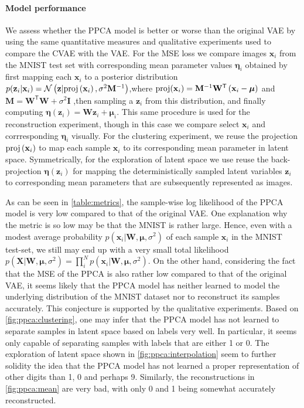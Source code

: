 \paragraph{Model performance}
We assess whether the PPCA model is better or worse than the original VAE by using the same quantitative measures and qualitative experiments used to compare the CVAE with the VAE\@. For the MSE loss we compare images $\mathbf{x}_i$ from the MNIST test set with corresponding mean parameter values $\bm{\eta}_i$ obtained by first mapping each $\mathbf{x}_i$ to a posterior distribution $p(\mathbf{z}_i|\mathbf{x}_i) = \mathcal{N}\left (\mathbf{z}| \text{proj}\left (\mathbf{x}_i\right), \sigma^2 \mathbf{M}^{-1}\right)$,where  $\text{proj}(\mathbf{x}_i) = \mathbf{M}^{-1} \mathbf{W}^{\mathsf{T}}\left (\mathbf{x}_i - \bm{\mu}\right)$ and $\mathbf{M} = \mathbf{W}^{\mathsf{T}}\mathbf{W} + \sigma^2 \mathbf{I}$ ,then sampling a $\mathbf{z}_i$ from this distribution, and finally computing $\bm{\eta}(\mathbf{z}_i) = \mathbf{W}\mathbf{z}_i + \bm{\mu}_i$. This same procedure is used for the reconstruction experiment, though in this case we compare select $\mathbf{x}_i$ and corrresponding $\bm{\eta}_i$ visually. For the clustering experiment, we reuse the projection  $\text{proj}\left (\mathbf{x}_i\right)$ to map each sample $\mathbf{x}_i$ to its corresponding mean parameter in latent space. Symmetrically, for the exploration of latent space we use reuse the back-projection $\bm{\eta}(\mathbf{z}_i)$ for mapping the deterministically sampled latent variables $\mathbf{z}_i$ to corresponding mean parameters that are subsequently represented as images.

As can be seen in \cref{table:metrics}, the sample-wise log likelihood of the PPCA model is very low compared to that of the original VAE\@. One explanation why the metric is so low may be that the MNIST is rather large. Hence, even with a modest average probability $p(\mathbf{x}_i | \mathbf{W}, \bm{\mu}, \sigma^2)$ of each sample $\mathbf{x}_i$ in the MNIST test-set, we still may end up with a very small total likelihood $p(\mathbf{X}|\mathbf{W}, \bm{\mu}, \sigma^2 ) = \prod_{i}^{N}p(\mathbf{x}_i | \mathbf{W}, \bm{\mu}, \sigma^2)$. On the other hand, considering the fact that the MSE of the PPCA is also rather low compared to that of the original VAE, it seems likely that the PPCA model has neither learned to model the underlying distribution of the MNIST dataset nor to reconstruct its samples accurately. This conjecture is supported by the qualitative experiments. Based on \cref{fig:ppca:clustering}, one may infer that the PPCA model has not learned to separate samples in latent space based on labels very well. In particular, it seems only capable of separating samples with labels that are either 1 or 0. The exploration of latent space shown in \cref{fig:ppca:interpolation} seem to further solidity the idea that the PPCA model has not learned a proper representation of other digits than 1, 0 and perhaps 9. Similarly, the reconstructions in \cref{fig:ppca:mean} are very bad, with only 0 and 1 being somewhat accurately reconstructed.


